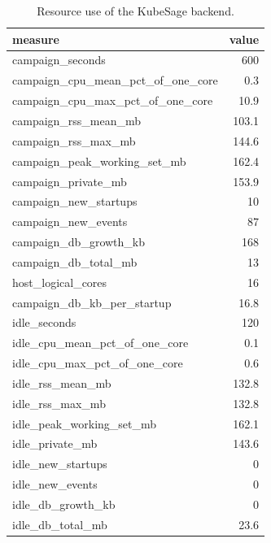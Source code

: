 \begin{table}[t]
\centering\small
\caption{Resource use of the KubeSage backend.}\label{tab:rq5_overhead}
\begin{tabular}{lr}
\toprule
measure & value \\
\midrule
campaign\_seconds & 600 \\
campaign\_cpu\_mean\_pct\_of\_one\_core & 0.3 \\
campaign\_cpu\_max\_pct\_of\_one\_core & 10.9 \\
campaign\_rss\_mean\_mb & 103.1 \\
campaign\_rss\_max\_mb & 144.6 \\
campaign\_peak\_working\_set\_mb & 162.4 \\
campaign\_private\_mb & 153.9 \\
campaign\_new\_startups & 10 \\
campaign\_new\_events & 87 \\
campaign\_db\_growth\_kb & 168 \\
campaign\_db\_total\_mb & 13 \\
host\_logical\_cores & 16 \\
campaign\_db\_kb\_per\_startup & 16.8 \\
idle\_seconds & 120 \\
idle\_cpu\_mean\_pct\_of\_one\_core & 0.1 \\
idle\_cpu\_max\_pct\_of\_one\_core & 0.6 \\
idle\_rss\_mean\_mb & 132.8 \\
idle\_rss\_max\_mb & 132.8 \\
idle\_peak\_working\_set\_mb & 162.1 \\
idle\_private\_mb & 143.6 \\
idle\_new\_startups & 0 \\
idle\_new\_events & 0 \\
idle\_db\_growth\_kb & 0 \\
idle\_db\_total\_mb & 23.6 \\
\bottomrule
\end{tabular}
\end{table}
